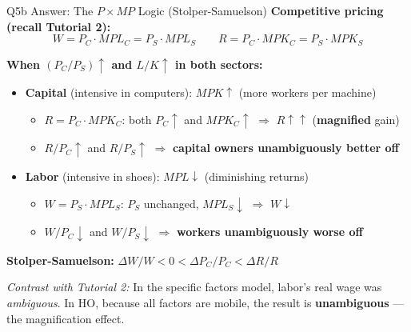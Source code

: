 \documentclass{beamer}
\begin{document}
\begin{frame}{Q5b Answer: The $P \times MP$ Logic (Stolper-Samuelson)}
\textbf{Competitive pricing (recall Tutorial 2):}
$$W = P_C \cdot MPL_C = P_S \cdot MPL_S \qquad R = P_C \cdot MPK_C = P_S \cdot MPK_S$$

\small
\textbf{When $(P_C/P_S) \uparrow$ and $L/K \uparrow$ in both sectors:}

\vspace{0.15cm}

\begin{itemize}
    \item \textbf{Capital} (intensive in computers): $MPK \uparrow$ (more workers per machine)
    \begin{itemize}
        \item $R = P_C \cdot MPK_C$: both $P_C \uparrow$ and $MPK_C \uparrow$ $\Rightarrow$ $R \uparrow\uparrow$ \; (\textbf{magnified} gain)
        \item $R/P_C \uparrow$ and $R/P_S \uparrow$ $\Rightarrow$ \textcolor{myblue}{\textbf{capital owners unambiguously better off}}
    \end{itemize}

    \vspace{0.15cm}

    \item \textbf{Labor} (intensive in shoes): $MPL \downarrow$ (diminishing returns)
    \begin{itemize}
        \item $W = P_S \cdot MPL_S$: $P_S$ unchanged, $MPL_S \downarrow$ $\Rightarrow$ $W \downarrow$
        \item $W/P_C \downarrow$ and $W/P_S \downarrow$ $\Rightarrow$ \textcolor{foreigncolor}{\textbf{workers unambiguously worse off}}
    \end{itemize}
\end{itemize}

\vspace{0.2cm}

\normalsize
\textbf{Stolper-Samuelson:} $\Delta W/W < 0 < \Delta P_C/P_C < \Delta R/R$

\vspace{0.1cm}

\small
\textit{Contrast with Tutorial 2:} In the specific factors model, labor's real wage was \textit{ambiguous}. In HO, because all factors are mobile, the result is \textbf{unambiguous} --- the magnification effect.
\end{frame}
\end{document}
